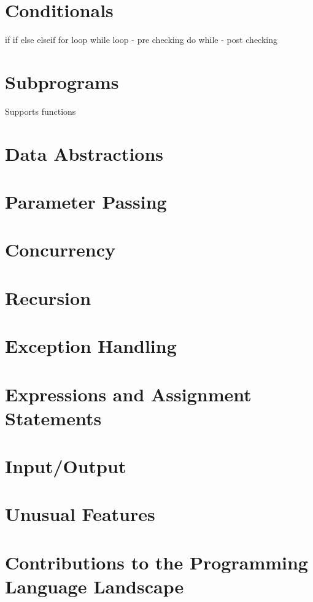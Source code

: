 \documentclass[12pt]{scrreprt}
\begin{document}
\chapter{Conditionals}

	if
	if else
	elseif
	for loop
	while loop - pre checking
	do while - post checking

\chapter{Subprograms}

	Supports functions

\chapter{Data Abstractions}

\chapter{Parameter Passing}

\chapter{Concurrency}

\chapter{Recursion}

\chapter{Exception Handling}

\chapter{Expressions and Assignment Statements}

\chapter{Input/Output}

\chapter{Unusual Features}

\chapter{Contributions to the Programming Language Landscape}
\end{document}
